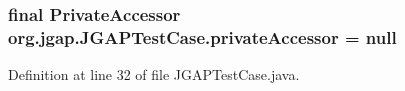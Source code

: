 \hypertarget{classorg_1_1jgap_1_1_j_g_a_p_test_case_a32462e38877d88fea7d7aad0538a42bd}{
\subsubsection[{private\-Accessor}]{\setlength{\rightskip}{0pt plus 5cm}final Private\-Accessor org.\-jgap.\-J\-G\-A\-P\-Test\-Case.\-private\-Accessor = null\hspace{0.3cm}{\ttfamily [static]}}}\label{classorg_1_1jgap_1_1_j_g_a_p_test_case_a32462e38877d88fea7d7aad0538a42bd}


Definition at line 32 of file J\-G\-A\-P\-Test\-Case.\-java.



